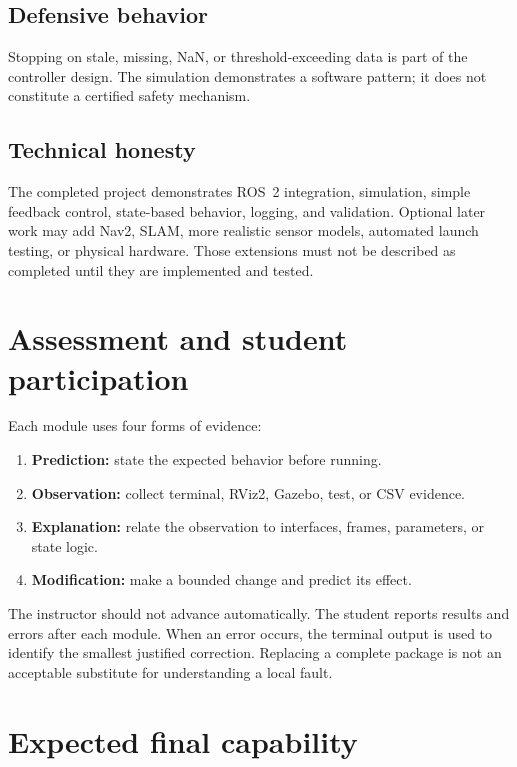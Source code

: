 \documentclass[11pt]{article}
\begin{document}
\subsection{Defensive behavior}

Stopping on stale, missing, NaN, or threshold-exceeding data is part of the
controller design. The simulation demonstrates a software pattern; it does not
constitute a certified safety mechanism.

\subsection{Technical honesty}

The completed project demonstrates ROS~2 integration, simulation, simple
feedback control, state-based behavior, logging, and validation. Optional later
work may add Nav2, SLAM, more realistic sensor models, automated launch testing,
or physical hardware. Those extensions must not be described as completed
until they are implemented and tested.

\section{Assessment and student participation}

Each module uses four forms of evidence:

\begin{enumerate}
  \item \textbf{Prediction:} state the expected behavior before running.
  \item \textbf{Observation:} collect terminal, RViz2, Gazebo, test, or CSV
        evidence.
  \item \textbf{Explanation:} relate the observation to interfaces, frames,
        parameters, or state logic.
  \item \textbf{Modification:} make a bounded change and predict its effect.
\end{enumerate}

The instructor should not advance automatically. The student reports results
and errors after each module. When an error occurs, the terminal output is used
to identify the smallest justified correction. Replacing a complete package is
not an acceptable substitute for understanding a local fault.

\section{Expected final capability}
\end{document}
